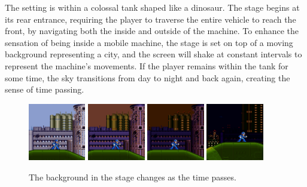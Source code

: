 The setting is within a colossal tank shaped like a dinosaur. The stage begins at its rear entrance, requiring the player to traverse the entire vehicle to reach the front, by navigating both the inside and outside of the machine. To enhance the sensation of being inside a mobile machine, the stage is set on top of a moving background representing a city, and the screen will shake at constant intervals to represent the machine's movements. If the player remains within the tank for some time, the sky transitions from day to night and back again, creating the sense of time passing.
\begin{figure}[htp]
	\centering
	\includegraphics[height=2.5cm]{figures/X2/Wheel_gator/Gator_day.jpg}
	\includegraphics[height=2.5cm]{figures/X2/Wheel_gator/Gator_day_1.jpg}
	\includegraphics[height=2.5cm]{figures/X2/Wheel_gator/Gator_day_2.jpg}
	\includegraphics[height=2.5cm]{figures/X2/Wheel_gator/Gator_day_3.jpg}
	\caption{The background in the stage changes as the time passes.}
\end{figure}


